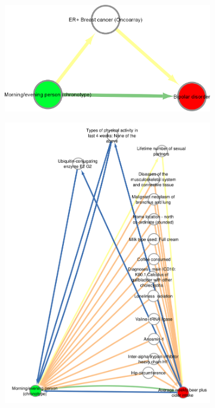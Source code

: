 \documentclass[journal,article,submit,moreauthors,pdftex]{Definitions/mdpi}
\begin{document}
\begin{figure}[htbp]
\begin{subfigure}{.35\linewidth}
\centering
	\includegraphics[width=\linewidth]{Figs/Analysis3/morning_bipolar.png}
\caption{}
\label{chronoBipolar}
\end{subfigure}
\begin{subfigure}{.65\linewidth}
\centering
	\includegraphics[width=\linewidth,keepaspectratio]{Figs/Analysis3/chronoBeer.png}

\end{subfigure}
\end{figure}
\end{document}

